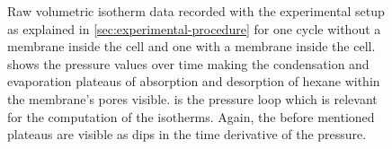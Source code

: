 \documentclass[../../../thesis.tex]{subfiles}
\begin{document}
\begin{figure}[ht]
{
          \label{subfig:vs_pressure}
          }
          \caption{Raw volumetric isotherm data recorded with the experimental setup
          as explained in \cref{sec:experimental-procedure} for one cycle without a
          membrane inside the cell and one with a membrane inside the cell.
          \protect{} shows the pressure values over time making
          the condensation and evaporation plateaus of absorption and desorption of
          hexane within the membrane's pores visible. \protect{} is
          the pressure loop which is relevant for the computation of the isotherms.
          Again, the before mentioned plateaus are visible as dips in the time
          derivative of the pressure.}
          \label{}
  \end{figure}
\end{document}
